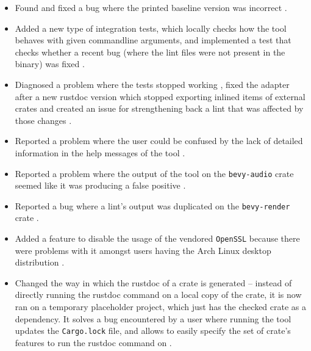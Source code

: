 \documentclass[licencjacka,en]{pracamgr}
\begin{document}
\begin{itemize}
\begin{itemize}
			\item Found and fixed a bug where the printed baseline version
				was incorrect \cite{pr_bugfix_printed_baseline}.
			\item Added a new type of integration tests, which locally checks
				how the tool behaves with given commandline arguments,
				and implemented a test that checks whether a recent bug
				(where the lint files were not present in the binary)
				was fixed \cite{pr_run_cargo_build}.
			\item Diagnosed a problem where the tests stopped working \cite{issue_tests_fail_unknown},
				fixed the adapter after a new rustdoc version which
				stopped exporting inlined items of external crates \cite{pr_rustdoc_trait_incompatibility}
				and created an issue for strengthening back a lint that was
				affected by those changes \cite{issue_strengthen_back}.
			\item Reported a problem where the user could be confused by the lack of
				detailed information in the help messages of the tool \cite{issue_help_messages}.
			\item Reported a problem where the output of the tool on the \texttt{bevy-audio} crate
				seemed like it was producing a false positive \cite{issue_bevy_audio}.
			\item Reported a bug where a lint's output was duplicated on the
				\texttt{bevy-render} crate \cite{issue_duplicated_failure}.
			\item Added a feature to disable the usage of the vendored \texttt{OpenSSL} \cite{pr_openssl}
				because there were problems with it amongst users having
				the Arch Linux desktop distribution \cite{issue_openssl}.
			\item Changed the way in which the rustdoc of a crate is generated
				-- instead of directly running the rustdoc command on a local copy of the crate,
				it is now ran on a temporary placeholder project,
				which just has the checked crate as a dependency.
				It solves a bug encountered by a user \cite{issue_apple_bitflags}
				where running the tool updates the \texttt{Cargo.lock} file,
				and allows to easily specify the set of crate's features to run the rustdoc command on
				\cite{pr_placeholder_1} \cite{pr_placeholder_2} \cite{pr_placeholder_3}
				\cite{pr_placeholder_4} \cite{pr_placeholder_5} \cite{pr_placeholder_6}.

\end{itemize}
\end{itemize}
\end{document}
